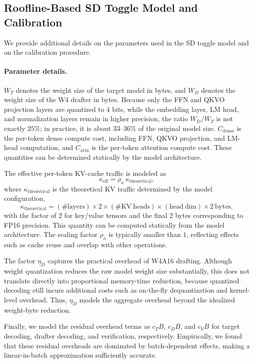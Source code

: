 \subsection{Roofline-Based SD Toggle Model and Calibration}
\label{app:toggle_calibration}

We provide additional details on the parameters used in the SD toggle model and on the calibration procedure.

\paragraph{Parameter details.}
$W_T$ denotes the weight size of the target model in bytes, and $W_D$ denotes the weight size of the W4 drafter in bytes.
Because only the FFN and QKVO projection layers are quantized to 4 bits, while the embedding layer, LM head, and normalization layers remain in higher precision, the ratio $W_D/W_T$ is not exactly $25\%$; in practice, it is about $33$--$36\%$ of the original model size.
$C_{\mathrm{dense}}$ is the per-token dense compute cost, including FFN, QKVO projection, and LM-head computation, and $C_{\mathrm{attn}}$ is the per-token attention compute cost.
These quantities can be determined statically by the model architecture.

The effective per-token KV-cache traffic is modeled as
\[
\kappa_{\mathrm{eff}} = \rho_{\kappa}\,\kappa_{\mathrm{theoretical}},
\]
where $\kappa_{\mathrm{theoretical}}$ is the theoretical KV traffic determined by the model configuration,
\[
\kappa_{\mathrm{theoretical}}
=
(\#\mathrm{layers})
\times 2
\times (\#\mathrm{KV\ heads})
\times (\mathrm{head\ dim})
\times 2~\mathrm{bytes},
\]
with the factor of $2$ for key/value tensors and the final $2$ bytes corresponding to FP16 precision.
This quantity can be computed statically from the model architecture.
The scaling factor $\rho_{\kappa}$ is typically smaller than $1$, reflecting effects such as cache reuse and overlap with other operations.

The factor $\eta_D$ captures the practical overhead of W4A16 drafting.
Although weight quantization reduces the raw model weight size substantially, this does not translate directly into proportional memory-time reduction, because quantized decoding still incurs additional costs such as on-the-fly dequantization and kernel-level overhead.
Thus, $\eta_D$ models the aggregate overhead beyond the idealized weight-byte reduction.

Finally, we model the residual overhead terms as $c_T B$, $c_D B$, and $c_V B$ for target decoding, drafter decoding, and verification, respectively.
Empirically, we found that these residual overheads are dominated by batch-dependent effects, making a linear-in-batch approximation sufficiently accurate.

